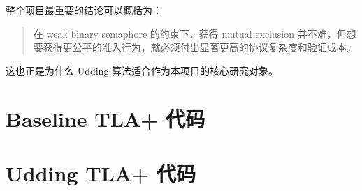\documentclass[11pt]{ctexart}
\begin{document}
整个项目最重要的结论可以概括为：

\begin{quote}
在 weak binary semaphore 的约束下，获得 mutual exclusion 并不难，但想要获得更公平的准入行为，就必须付出显著更高的协议复杂度和验证成本。
\end{quote}

这也正是为什么 Udding 算法适合作为本项目的核心研究对象。

\appendix

\section{Baseline TLA+ 代码}


\section{Udding TLA+ 代码}

\end{document}
